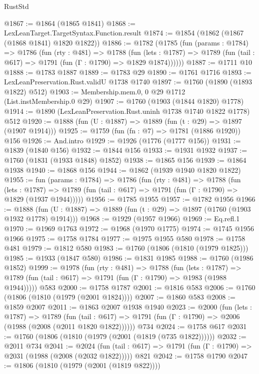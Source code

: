 \begin{lexlean}{RustStd}
\begin{coremodule}
@1867 := @1864 (@1865 @1841)
@1868 := LexLeanTarget.TargetSyntax.Function.result
@1874 := @1854 (@1862 (@1867 (@1868 @1841) @1820 @1822))
@1886 := @1782
    (@1785
      (fun (params : @1784) =>
      @1786
        (fun (rty : @481) =>
        @1788
          (fun (lets : @1787) =>
          @1789 (fun (tail : @617) => @1791 (fun (Γ : @1790) => @1829 @1874))))))
@1887 := @1711 @10
@1888 := @1783 @1887
@1889 := @1783 @29
@1890 := @1761 @1716
@1893 := LexLeanPreservation.Rust.validU @1738 @1740
@1897 := @1760 (@1890 (@1893 @1822) @512)
@1903 := Membership.mem.{0, 0} @29 @1712 (List.instMembership.{0} @29)
@1907 := @1760 (@1903 (@1844 @1820) @1778)
@1914 := @1890 (LexLeanPreservation.Rust.uninh @1738 @1740 @1822 @1778) @512
@1920 := @1888 (fun (U : @1887) => @1889 (fun (t : @29) => @1897 (@1907 @1914)))
@1925 := @1759 (fun (fn : @7) => @1781 (@1886 @1920)) @156
@1926 := And.intro
@1929 := @1926 (@1776 (@1777 @156))
@1931 := @1839 (@1840 @156)
@1932 := @1844 @156
@1933 := @1931 @1932
@1937 := @1760 (@1831 (@1933 @1848) @1852)
@1938 := @1865 @156
@1939 := @1864 @1938
@1940 := @1868 @156
@1944 := @1862 (@1939 @1940 @1820 @1822)
@1955 := fun (params : @1784) =>
  @1786
    (fun (rty : @481) =>
    @1788
      (fun (lets : @1787) =>
      @1789 (fun (tail : @617) => @1791 (fun (Γ : @1790) => @1829 (@1937 @1944)))))
@1956 := @1785 @1955
@1957 := @1782 @1956
@1966 := @1888 (fun (U : @1887) => @1889 (fun (t : @29) => @1897 (@1760 (@1903 @1932 @1778) @1914)))
@1968 := @1929 (@1957 @1966)
@1969 := Eq.refl.{1}
@1970 := @1969 @1763
@1972 := @1968 (@1970 @1775)
@1974 := @1745 @1956 @1966
@1975 := @1758 @1784
@1977 := @1975 @1955 @580
@1978 := @1758 @481
@1979 := @1812 @580
@1983 := @1760 (@1806 (@1810 (@1979 @1825)))
@1985 := @1933 (@1847 @580)
@1986 := @1831 @1985
@1988 := @1760 (@1986 @1852)
@1999 := @1978
    (fun (rty : @481) =>
    @1788
      (fun (lets : @1787) =>
      @1789 (fun (tail : @617) => @1791 (fun (Γ : @1790) => @1983 (@1988 @1944)))))
    @583
@2000 := @1758 @1787
@2001 := @1816 @583
@2006 := @1760 (@1806 (@1810 (@1979 (@2001 @1824))))
@2007 := @1860 @583
@2008 := @1859 @2007
@2011 := @1863 @2007 @1938 @1940
@2023 := @2000
    (fun (lets : @1787) =>
    @1789
      (fun (tail : @617) => @1791 (fun (Γ : @1790) => @2006 (@1988 (@2008 (@2011 @1820 @1822))))))
    @734
@2024 := @1758 @617
@2031 := @1760 (@1806 (@1810 (@1979 (@2001 (@1819 (@735 @1822))))))
@2032 := @2011 @734
@2041 := @2024
    (fun (tail : @617) => @1791 (fun (Γ : @1790) => @2031 (@1988 (@2008 (@2032 @1822)))))
    @821
@2042 := @1758 @1790
@2047 := @1806 (@1810 (@1979 (@2001 (@1819 @822))))

\end{coremodule}
\end{lexlean}
